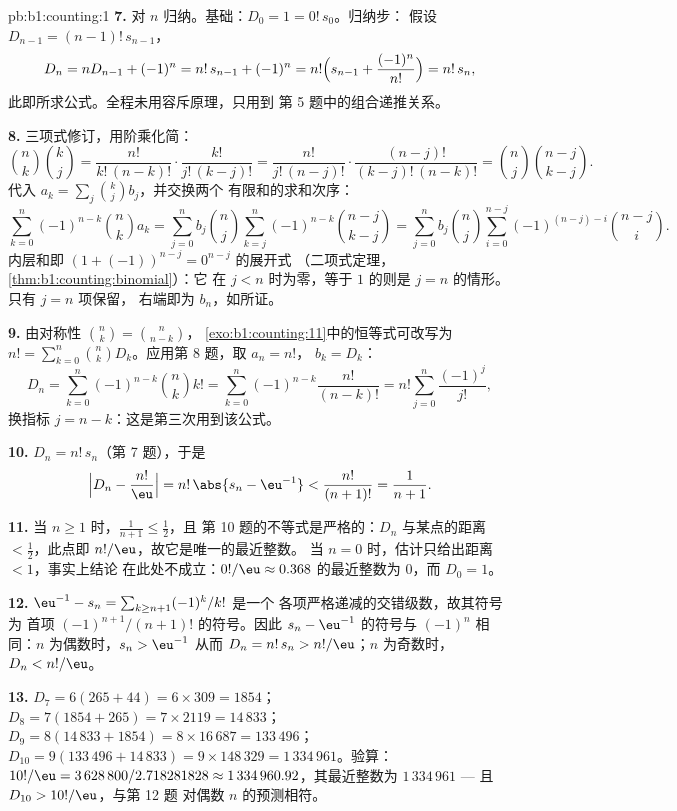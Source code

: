 \begin{solution}{pb:b1:counting:1}
\textbf{7.} 对 $n$ 归纳。基础：$D_0 = 1 = 0!\,s_0$。归纳步：
假设 $D_{n-1} = (n-1)!\,s_{n-1}$，
\[
D_n = nD_{n-1} + (-1)^n = n!\,s_{n-1} + (-1)^n
= n!\Bigl(s_{n-1} + \frac{(-1)^n}{n!}\Bigr) = n!\,s_n ,
\]
此即所求公式。全程未用容斥原理，只用到
第 5 题中的组合递推关系。

\textbf{8.} 三项式修订，用阶乘化简：
\[
\binom nk \binom kj
= \frac{n!}{k!\,(n-k)!} \cdot \frac{k!}{j!\,(k-j)!}
= \frac{n!}{j!\,(n-j)!} \cdot \frac{(n-j)!}{(k-j)!\,(n-k)!}
= \binom nj \binom{n-j}{k-j} .
\]
代入 $a_k = \sum_j \binom kj b_j$，并交换两个
有限和的求和次序：
\[
\sum_{k=0}^{n} (-1)^{n-k} \binom nk a_k
= \sum_{j=0}^{n} b_j \binom nj
\sum_{k=j}^{n} (-1)^{n-k} \binom{n-j}{k-j}
= \sum_{j=0}^{n} b_j \binom nj
\sum_{i=0}^{n-j} (-1)^{(n-j)-i} \binom{n-j}{i} .
\]
内层和即 $(1 + (-1))^{n-j} = 0^{n-j}$ 的展开式
（二项式定理，\cref{thm:b1:counting:binomial}）：它
在 $j < n$ 时为零，等于 $1$ 的则是 $j = n$ 的情形。只有 $j = n$ 项保留，
右端即为 $b_n$，如所证。

\textbf{9.} 由对称性 $\binom nk = \binom n{n-k}$，
\cref{exo:b1:counting:11}中的恒等式可改写为 $n! =
\sum_{k=0}^n \binom nk D_k$。应用第 8 题，取 $a_n = n!$，
$b_k = D_k$：
\[
D_n = \sum_{k=0}^{n} (-1)^{n-k} \binom nk k!
= \sum_{k=0}^{n} (-1)^{n-k} \frac{n!}{(n-k)!}
= n! \sum_{j=0}^{n} \frac{(-1)^j}{j!} ,
\]
换指标 $j = n - k$：这是第三次用到该公式。

\textbf{10.} $D_n = n!\,s_n$（第 7 题），于是
\[
\Bigl| D_n - \frac{n!}{\eu} \Bigr|
= n!\,\abs{s_n - \eu^{-1}} < \frac{n!}{(n+1)!} = \frac1{n+1} .
\]

\textbf{11.} 当 $n \geq 1$ 时，$\frac1{n+1} \leq \frac12$，且
第 10 题的不等式是严格的：$D_n$ 与某点的距离
$< \frac12$，此点即 $n!/\eu$，故它是唯一的最近整数。
当 $n = 0$ 时，估计只给出距离 $< 1$，事实上结论
在此处不成立：$0!/\eu \approx 0.368$ 的最近整数为 $0$，而
$D_0 = 1$。

\textbf{12.} $\eu^{-1} - s_n = \sum_{k \geq n+1} (-1)^k/k!$ 是一个
各项严格递减的交错级数，故其符号为
首项 $(-1)^{n+1}/(n+1)!$ 的符号。因此 $s_n -
\eu^{-1}$ 的符号与 $(-1)^n$ 相同：$n$ 为偶数时，$s_n > \eu^{-1}$
从而 $D_n = n!\,s_n > n!/\eu$；$n$ 为奇数时，$D_n < n!/\eu$。

\textbf{13.} $D_7 = 6(265 + 44) = 6 \times 309 = 1854$；$D_8 =
7(1854 + 265) = 7 \times 2119 = 14\,833$；$D_9 = 8(14\,833 + 1854)
= 8 \times 16\,687 = 133\,496$；$D_{10} = 9(133\,496 + 14\,833) =
9 \times 148\,329 = 1\,334\,961$。验算：$10!/\eu = 3\,628\,800 /
2.718281828 \approx 1\,334\,960.92$，其最近整数为
$1\,334\,961$ --- 且 $D_{10} > 10!/\eu$，与第 12 题
对偶数 $n$ 的预测相符。


\end{solution}

